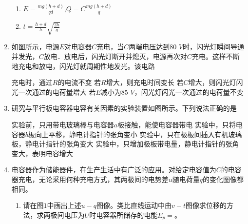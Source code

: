 \begin{enumerate}[leftmargin=0em]
{\begin{enumerate}
\item 
$E=\frac { m g ( h + d ) } { q d }$,$Q=C \frac { m g ( h + d ) } { q }$
\item 
$t=\frac { h + d } { h } \sqrt { \frac { 2 h } { g } }$


\end{enumerate}
}



\item
{}
如图所示，电源$ E $对电容器$ C $充电，当$ C $两端电压达到$ 80 $ $ V $时，闪光灯瞬间导通并发光，$ C $放电．放电后，闪光灯断开并熄灭，电源再次对$ C $充电。这样不断地充电和放电，闪光灯就周期性地发光。该电路  
\begin{figure}[h!]
\centering

\end{figure}


\fourchoices
{充电时，通过$ R $的电流不变}
{若$ R $增大，则充电时间变长}
{若$ C $增大，则闪光灯闪光一次通过的电荷量增大}
{若$ E $减小为$ 85 $ $ V $，闪光灯闪光一次通过的电荷量不变}





\item
{}
研究与平行板电容器电容有关因素的实验装置如图所示。下列说法正确的是  
\begin{figure}[h!]
\centering

\end{figure}


\fourchoices
{实验前，只用带电玻璃棒与电容器$ a $板接触，能使电容器带电}
{实验中，只将电容器$ b $板向上平移，静电计指针的张角变小}
{实验中，只在极板间插入有机玻璃板，静电计指针的张角变大}
{实验中，只增加极板带电量，静电计指针的张角变大，表明电容增大}







\item 
{}
电容器作为储能器件，在生产生活中有广泛的应用。对给定电容值为$ C $的电容器充电，无论采用何种充电方式，其两极间的电势差$ u $随电荷量$ q $的变化图像都相同。

\begin{enumerate}
\renewcommand{\labelenumi}{\arabic{enumi}.}
\item
请在图$ 1 $中画出上述$ u - q $图像。类比直线运动中由$ v - t $图像求位移的方法，求两极间电压为$ U $时电容器所储存的电能$ E_{p}= $。
\begin{figure}[h!]
\centering

\end{figure}




\end{enumerate}
\end{enumerate}
